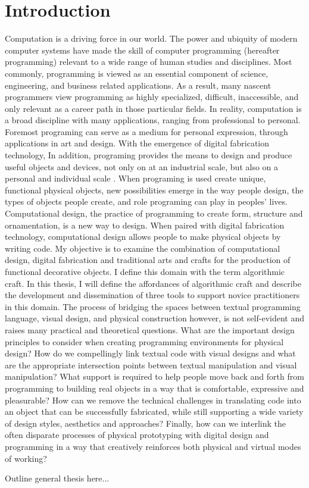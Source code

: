 \chapter{Introduction}

Computation is a driving force in our world. The power and ubiquity of  modern computer systems have made the skill of computer programming (hereafter programming) relevant to a wide range of human studies and disciplines. Most commonly, programming is viewed as an essential component of science, engineering, and business related applications\cite{resnick1}. As a result, many nascent programmers view programming as highly specialized, difficult, inaccessible, and only relevant as a career path in those particular fields. In reality, computation is a broad discipline with many applications, ranging from professional to personal. Foremost programing can serve as a medium for personal expression, through applications in art and design. With the emergence of digital fabrication technology, In addition, programing provides the means to design and produce useful objects and devices, not only on at an industrial scale, but also on a personal and individual scale \cite{mellis_thesis}. When programing is used create unique, functional physical objects, new possibilities emerge in the way people design,  the types of objects people create, and role programing can play in peoples' lives.  Computational design, the practice of programming to create form, structure and ornamentation, is a new way to design. When paired with digital fabrication technology, computational design allows people to make physical objects by writing code. My objective is to examine the combination of computational design, digital fabrication and traditional arts and crafts for the production of functional decorative objects. I define this domain with the term algorithmic craft. In this thesis, I will define the affordances of algorithmic craft and describe the development and dissemination of three tools to support novice practitioners in this domain. The process of bridging the spaces between textual programming language, visual design, and physical construction however, is not self-evident and raises many practical and theoretical questions.  What are the important design principles to consider when creating  programming environments for physical design? How do we compellingly link textual code with visual designs and what are the appropriate intersection points between textual manipulation and visual manipulation? What support is required to help people move back and forth from programming to building real objects in a way that is comfortable, expressive and pleasurable? How can we remove the technical challenges in translating code into an object that can be successfully fabricated, while still supporting a wide variety of design styles, aesthetics and approaches? Finally, how can we interlink the often disparate processes of physical prototyping with digital design and programming in a way that creatively reinforces both physical and virtual modes of working?


Outline general thesis here...



